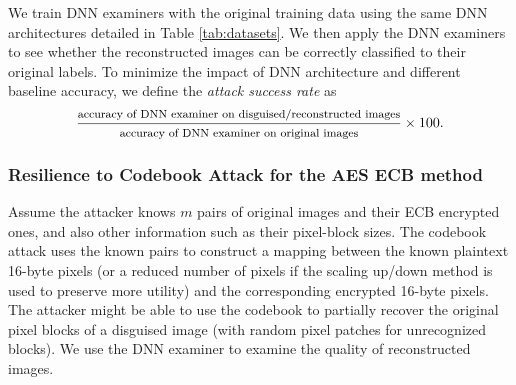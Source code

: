 \documentclass[conference]{IEEEtran}
\begin{document}
We train DNN examiners with the original training data using the same DNN architectures detailed in Table \ref{tab:datasets}. We then apply the DNN examiners to see whether the reconstructed images can be correctly classified to their original labels.  To minimize the impact of DNN architecture and different baseline accuracy, we define the \emph{attack success rate} as  
\[\frac{\text{\footnotesize accuracy of DNN examiner on disguised/reconstructed images}}{ \text{\footnotesize accuracy of DNN examiner on original images}} \times 100.\]
 

\subsubsection{Resilience to Codebook Attack for the AES ECB method}
Assume the attacker knows $m$ pairs of original images and their ECB encrypted ones, and also other information such as their pixel-block sizes. The codebook attack uses the known pairs to construct a mapping between the known plaintext 16-byte pixels (or a reduced number of pixels if the scaling up/down method is used to preserve more utility) and the corresponding encrypted 16-byte pixels. The attacker might be able to use the codebook to partially recover the original pixel blocks of a disguised image (with random pixel patches for unrecognized blocks). We use the DNN examiner to examine the quality of reconstructed images. 

\end{document}
